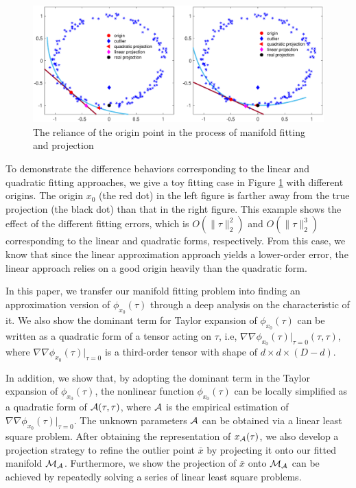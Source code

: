 \documentclass[aos,preprint]{imsart}
\theoremstyle{remark}
\begin{document}
\begin{figure}[t!] %
   \centering
   \includegraphics[width=\linewidth]{democ3.eps} 
   \caption{The reliance of the origin point in the process of manifold fitting and projection}
   \label{Comparison}
\end{figure}
To demonstrate the difference behaviors corresponding to the linear and quadratic fitting approaches, we give a toy fitting case in Figure \ref{Comparison} with different origins. The origin $x_0$ (the red dot) in the left figure is farther away from the true projection (the black dot) than that in the right figure.  This example shows the effect of the different fitting errors, which is $O(\|\tau\|_2^2)$ and $O(\|\tau\|_2^3)$ corresponding to the linear and quadratic forms, respectively. From this case, we know that since the linear approximation approach yields a lower-order error, the linear approach relies on a good origin heavily than the quadratic form.
 

In this paper, we transfer our manifold fitting problem into finding an approximation version of $\phi_{x_0}(\tau)$ through a deep analysis on the characteristic of it. We also show the dominant term for Taylor expansion of $\phi_{x_0}(\tau)$ can be written as a quadratic form of a tensor acting on $\tau$, i.e, $\nabla\nabla \phi_{x_0}(\tau)|_{\tau=0}(\tau,\tau)$, where $\nabla\nabla\phi_{x_0}(\tau)|_{\tau=0}$ is a third-order tensor with shape of $d\times d\times (D-d)$.  

In addition, we show that, by adopting the dominant term in the Taylor expansion of $\phi_{x_0}(\tau)$,  the nonlinear function $\phi_{x_0}(\tau)$ can be locally simplified as a quadratic form of ${\cal A}(\tau,\tau)$, where $\cal A$ is the empirical estimation of $\nabla\nabla \phi_{x_0}(\tau)|_{\tau=0}$. The unknown parameters $\cal A$ can be obtained via a linear least square problem. After obtaining the representation of $x_{\cal A}(\tau)$, we also develop a projection strategy to refine the outlier point $\bar{x}$ by projecting it onto our fitted manifold $\cal M_A$. Furthermore, we show the projection of $\bar{x}$ onto $\cal M_A$ can be achieved by repeatedly solving a series of linear least square problems.
\end{document}

